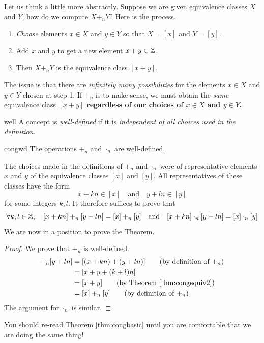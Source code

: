 Let us think a little more abstractly. Suppose we are given equivalence classes $X$ and $Y$, how do we compute $X+_nY$? Here is the process.
\begin{enumerate}
  \item \emph{Choose} elements $x\in X$ and $y\in Y$ so that $X=[x]$ and $Y=[y]$.
  \item Add $x$ and $y$ to get a new element $x+y\in\mathbb{Z}$.
  \item Then $X+_nY$ is the equivalence class $[x+y]$.
\end{enumerate}
The issue is that there are \emph{infinitely many possibilities} for the elements $x\in X$ and $y\in Y$ chosen at step 1. If $+_n$ is to make sense, we must obtain the \emph{same} equivalence class $[x+y]$ {\bf regardless of our choices of $x\in X$ and $y\in Y$.}

\begin{defn}{}{well}
	A concept is \emph{well-defined} if it is \emph{independent of all choices used in the definition.}
\end{defn}

\begin{thm}{}{congwd}
	The operations $+_n$ and $\cdot_n$ are well-defined.
\end{thm}

The choices made in the definitions of $+_n$ and $\cdot_n$ were of representative elements $x$ and $y$ of the equivalence classes $[x]$ and $[y]$. All representatives of these classes have the form
\[
	x+kn\in[x]\quad\text{and}\quad y+ln\in[y]
\]
for some integers $k,l$. It therefore suffices to prove that
\[
	\forall k,l\in\mathbb{Z},\quad [x+kn]+_n[y+ln]=[x]+_n[y]\quad\text{and}\quad [x+kn]\cdot_n[y+ln]=[x]\cdot_n[y]
\]
We are now in a position to prove the Theorem.

\begin{proof}
	We prove that $+_n$ is well-defined.
	\begin{align*}
		[x+kn]+_n[y+ln]&=[(x+kn)+(y+ln)]\tag*{(by definition of $+_n$)}\\
		&=[x+y+(k+l)n]\\
		&=[x+y]\tag*{(by Theorem \ref{thm:congequiv2})}\\
		&=[x]+_n[y]\tag*{(by definition of $+_n$)}
	\end{align*}
	The argument for $\cdot_n$ is similar.
\end{proof}

You should re-read Theorem \ref{thm:congbasic} until you are comfortable that we are doing the same thing!

